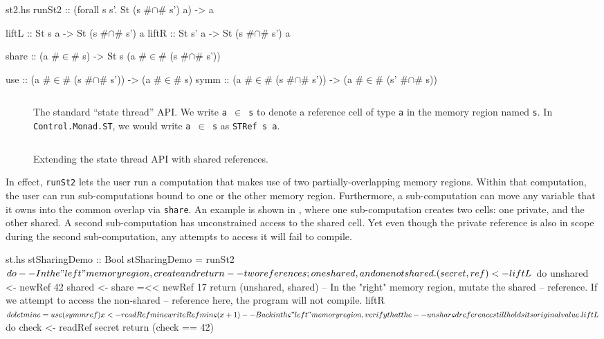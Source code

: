 \documentclass[format=sigplan, review=false, screen=true]{acmart}
\begin{document}
\begin{filecontents*}{st2.hs}
runSt2 :: (forall s s'. St (s #$\cap$# s') a) -> a

liftL :: St s a -> St (s #$\cap$# s') a
liftR :: St s' a -> St (s #$\cap$# s') a

share :: (a #$\in$# s) -> St s (a #$\in$# (s #$\cap$# s'))

use  :: (a #$\in$# (s #$\cap$# s')) -> (a #$\in$# s)
symm :: (a #$\in$# (s #$\cap$# s')) -> (a #$\in$# (s' #$\cap$# s))
\end{filecontents*}

\begin{figure}
  \inputminted{haskell}{st1.hs}
  \caption{The standard ``state thread'' API. We write \texttt{a $\in$ s} to
    denote a reference cell of type \texttt{a} in the memory region named \texttt{s}.
    In \texttt{Control.Monad.ST}, we would write \texttt{a $\in$ s} as
    \texttt{STRef s a}.\label{st-api}}
\end{figure}

\begin{figure}
  \inputminted{haskell}{st2.hs}
  \caption{Extending the state thread API with shared references.\label{st-sharing-api}}
\end{figure}
In effect, \texttt{runSt2} lets the user run a computation that makes use of
two partially-overlapping memory regions. Within that computation, the user
can run sub-computations bound to one or the other memory region. Furthermore,
a sub-computation can move any variable that it owns into the common overlap
via \texttt{share}. An example is shown in , where one sub-computation
creates two cells: one private, and the other shared. A second sub-computation has unconstrained
access to the shared cell. Yet even though the private reference is also in scope during
the second sub-computation, any attempts to access it will fail to compile.

\begin{filecontents*}{st.hs}
stSharingDemo :: Bool
stSharingDemo = runSt2 $ do
  -- In the "left" memory region, create and return
  -- two references; one shared, and one not shared.
  (secret, ref) <- liftL $ do
      unshared <- newRef 42
      shared   <- share =<< newRef 17
      return (unshared, shared)
  -- In the "right" memory region, mutate the shared
  -- reference. If we attempt to access the non-shared
  -- reference here, the program will not compile.
  liftR $ do
      let mine = use (symm ref)
      x <- readRef mine
      writeRef mine (x + 1)
  -- Back in the "left" memory region, verify that the
  -- unshared reference still holds its original value.
  liftL $ do
      check <- readRef secret
      return (check == 42)
\end{filecontents*}
\end{document}
